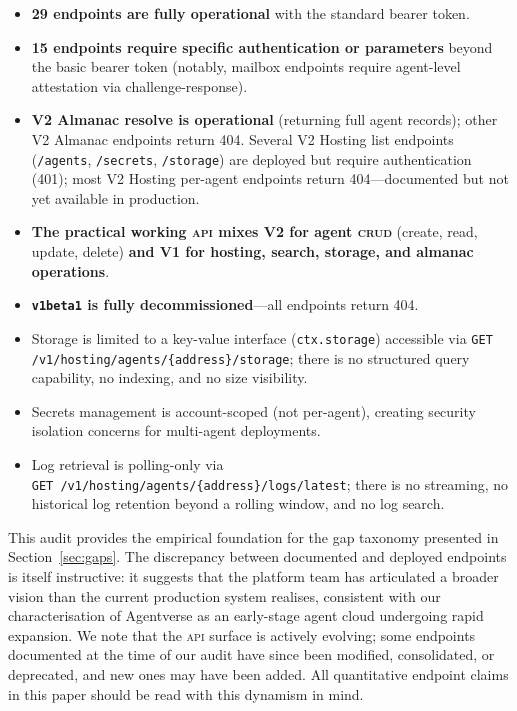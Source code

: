 \documentclass[twoside,11pt]{article}
\begin{document}
\begin{itemize}[leftmargin=*]

\item \textbf{29 endpoints are fully operational} with the standard bearer
token.

\item \textbf{15 endpoints require specific authentication or parameters}
beyond the basic bearer token (notably, mailbox endpoints require agent-level
attestation via challenge-response).

\item \textbf{V2 Almanac resolve is operational} (returning full agent records);
other V2 Almanac endpoints return 404.  Several V2 Hosting list endpoints
(\texttt{/agents}, \texttt{/secrets}, \texttt{/storage}) are deployed but
require authentication (401); most V2 Hosting per-agent endpoints return
404---documented but not yet available in production.

\item \textbf{The practical working \textsc{api} mixes V2 for agent
\textsc{crud}} (create, read, update, delete) \textbf{and V1 for hosting,
search, storage, and almanac operations}.

\item \textbf{\texttt{v1beta1} is fully decommissioned}---all endpoints return
404.

\item Storage is limited to a key-value interface (\texttt{ctx.storage})
accessible via \texttt{GET /v1/hosting/\allowbreak{}agents/\allowbreak{}\{address\}/\allowbreak{}storage}; there is
no structured query capability, no indexing, and no size visibility.

\item Secrets management is account-scoped (not per-agent), creating security
isolation concerns for multi-agent deployments.

\item Log retrieval is polling-only via
\texttt{GET~\allowbreak{}/v1/hosting/\allowbreak{}agents/\{address\}/\allowbreak{}logs/latest}; there is no
streaming, no historical log retention beyond a rolling window, and no log
search.

\end{itemize}

This audit provides the empirical foundation for the gap taxonomy presented in
Section~\ref{sec:gaps}.  The discrepancy between documented and deployed
endpoints is itself instructive: it suggests that the platform team has
articulated a broader vision than the current production system realises,
consistent with our characterisation of Agentverse as an early-stage agent
cloud undergoing rapid expansion.  We note that the \textsc{api} surface is
actively evolving; some endpoints documented at the time of our audit have
since been modified, consolidated, or deprecated, and new ones may have
been added.  All quantitative endpoint claims in this paper should be read
with this dynamism in mind.
\end{document}
